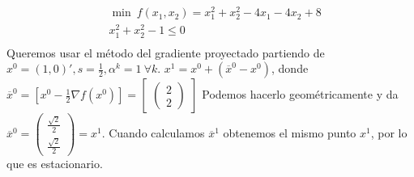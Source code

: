 \documentclass[MIOP.tex]{subfiles}
\begin{document}
\begin{ej}
\begin{align*}
&\min\ f(x_1,x_2)=x_1^2+x_2^2-4x_1-4x_2+8\\
& x_1^2+x_2^2-1\leq 0\\
\end{align*} 
Queremos usar el método del gradiente proyectado partiendo de $x^0=(1,0)', s=\frac{1}{2}, \alpha^k =1\ \forall k$. $x^1=x^0+(\overline{x}^0-x^0)$, donde $\overline{x}^0=[x^0-\frac{1}{2}\nabla f(x^0)]=\begin{bmatrix}
\begin{pmatrix}
2\\
2
\end{pmatrix}
\end{bmatrix}$
Podemos hacerlo geométricamente y da $\overline{x}^0=\begin{pmatrix}
\frac{\sqrt{2}}{2}\\
\frac{\sqrt{2}}{2}
\end{pmatrix}=x^1$. Cuando calculamos $\overline{x}^1$ obtenemos el mismo punto $x^1$, por lo que es estacionario. 
\end{ej}
\end{document}
